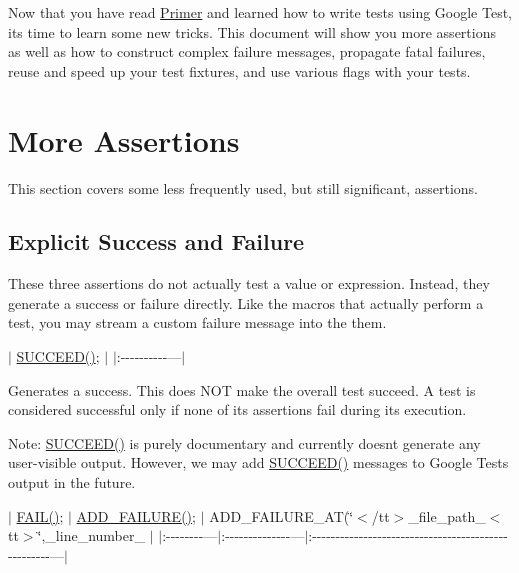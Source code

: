 Now that you have read \hyperlink{_v1__7___primer_8md}{Primer} and learned how to write tests using Google Test, it\textquotesingle{}s time to learn some new tricks. This document will show you more assertions as well as how to construct complex failure messages, propagate fatal failures, reuse and speed up your test fixtures, and use various flags with your tests.

\section*{More Assertions}

This section covers some less frequently used, but still significant, assertions.

\subsection*{Explicit Success and Failure}

These three assertions do not actually test a value or expression. Instead, they generate a success or failure directly. Like the macros that actually perform a test, you may stream a custom failure message into the them.

$\vert$ {\ttfamily \hyperlink{gtest_8h_a75adcdf89f69b0b615e395daafc315af}{S\+U\+C\+C\+E\+E\+D()};} $\vert$ $\vert$\+:-\/-\/-\/-\/-\/-\/-\/-\/-\/-\/---$\vert$

Generates a success. This does N\+OT make the overall test succeed. A test is considered successful only if none of its assertions fail during its execution.

Note\+: {\ttfamily \hyperlink{gtest_8h_a75adcdf89f69b0b615e395daafc315af}{S\+U\+C\+C\+E\+E\+D()}} is purely documentary and currently doesn\textquotesingle{}t generate any user-\/visible output. However, we may add {\ttfamily \hyperlink{gtest_8h_a75adcdf89f69b0b615e395daafc315af}{S\+U\+C\+C\+E\+E\+D()}} messages to Google Test\textquotesingle{}s output in the future.

$\vert$ {\ttfamily \hyperlink{gtest_8h_a3e26a8d27caa386ed0ea7ce9d5b7c4ed}{F\+A\+I\+L()};} $\vert$ {\ttfamily \hyperlink{gtest_8h_adc16b5b0a740c39084ea5c9e960e3063}{A\+D\+D\+\_\+\+F\+A\+I\+L\+U\+R\+E()};} $\vert$ {\ttfamily A\+D\+D\+\_\+\+F\+A\+I\+L\+U\+R\+E\+\_\+\+AT(\char`\"{}$<$/tt$>$\+\_\+file\+\_\+path\+\_\+$<$tt$>$\char`\"{},}\+\_\+line\+\_\+number\+\_\+{\ttfamily );} $\vert$ $\vert$\+:-\/-\/-\/-\/-\/-\/-\/-\/---$\vert$\+:-\/-\/-\/-\/-\/-\/-\/-\/-\/-\/-\/-\/-\/-\/---$\vert$\+:-\/-\/-\/-\/-\/-\/-\/-\/-\/-\/-\/-\/-\/-\/-\/-\/-\/-\/-\/-\/-\/-\/-\/-\/-\/-\/-\/-\/-\/-\/-\/-\/-\/-\/-\/-\/-\/-\/-\/-\/-\/-\/-\/-\/-\/-\/-\/-\/-\/-\/-\/---$\vert$

